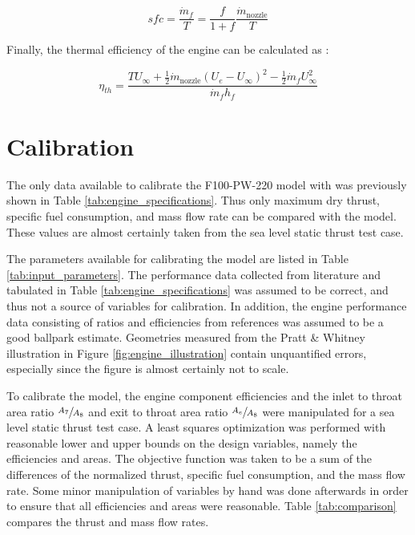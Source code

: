 \documentclass{article}
\begin{document}
\begin{equation}
\label{eq:sfc}
sfc = \frac{\dot{m}_f}{T} = \frac{f}{1 + f} \frac{\dot{m}_{\textrm{nozzle}}}{T}
\end{equation}

Finally, the thermal efficiency of the engine can be calculated as \cite{cantwell283}:

\begin{equation}
\label{eq:thermalEfficiency}
\eta_{th} = \frac{T U_{\infty} + \frac{1}{2} \dot{m}_{\textrm{nozzle}} \left( U_e - U_{\infty} \right) ^2 - \frac{1}{2} \dot{m}_f U_{\infty}^2}{\dot{m}_f h_f}
\end{equation}

\section{Calibration}

The only data available to calibrate the F100-PW-220 model with was previously shown in Table \ref{tab:engine_specifications}. Thus only maximum dry thrust, specific fuel consumption, and mass flow rate can be compared with the model. These values are almost certainly taken from the sea level static thrust test case. 

The parameters available for calibrating the model are listed in Table \ref{tab:input_parameters}. The performance data collected from literature and tabulated in Table \ref{tab:engine_specifications} was assumed to be correct, and thus not a source of variables for calibration. In addition, the engine performance data consisting of ratios and efficiencies from references \cite{cantwell283,Lee2009} was assumed to be a good ballpark estimate. Geometries measured from the Pratt \& Whitney illustration in Figure \ref{fig:engine_illustration} contain unquantified errors, especially since the figure is almost certainly not to scale. 

To calibrate the model, the engine component efficiencies and the inlet to throat area ratio $\sfrac{A_7}{A_8}$ and exit to throat area ratio $\sfrac{A_e}{A_8}$ were manipulated for a sea level static thrust test case. A least squares optimization was performed with reasonable lower and upper bounds on the design variables, namely the efficiencies and areas. The objective function was taken to be a sum of the differences of the normalized thrust, specific fuel consumption, and the mass flow rate. Some minor manipulation of variables by hand was done afterwards in order to ensure that all efficiencies and areas were reasonable. Table \ref{tab:comparison} compares the thrust and mass flow rates.
\end{document}
